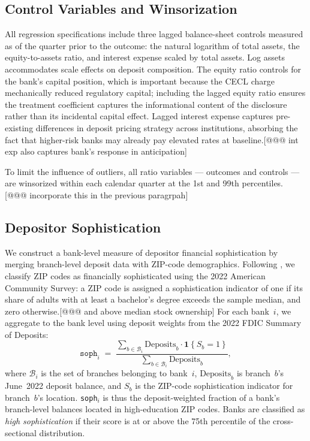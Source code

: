 \subsection{Control Variables and Winsorization}
\label{sec:data:controls}

All regression specifications include three lagged balance-sheet controls
measured as of the quarter prior to the outcome: the natural logarithm of total
assets, the equity-to-assets ratio, and interest expense scaled by total assets.
Log assets accommodates scale effects on deposit composition. The
equity ratio controls for the bank's capital position, which is important because
the CECL charge mechanically reduced regulatory capital; including the lagged
equity ratio ensures the treatment coefficient captures the informational content
of the disclosure rather than its incidental capital effect. Lagged interest
expense captures pre-existing differences in deposit pricing strategy across
institutions, absorbing the fact that higher-risk banks may already pay elevated
rates at baseline.[@@@ int exp also captures bank's response in anticipation]

To limit the influence of outliers, all ratio variables --- outcomes and
controls --- are winsorized within each calendar quarter at the 1st and 99th
percentiles. [@@@ incorporate this in the previous paragrpah]

\subsection{Depositor Sophistication}
\label{sec:data:sophistication}

We construct a bank-level measure of depositor financial sophistication by
merging branch-level deposit data with ZIP-code demographics. Following
\citet{narayanan2026decline}, we classify ZIP codes as financially sophisticated
using the 2022 American Community Survey: a ZIP code is assigned a sophistication
indicator of one if its share of adults with at least a bachelor's degree exceeds
the sample median, and zero otherwise.[@@@ and above median stock ownership]
For each bank~$i$, we aggregate to the bank level using deposit weights from
the 2022 FDIC Summary of Deposits:
\begin{equation}
  \texttt{soph}_{i}
  \;=\;
  \frac{
    \displaystyle\sum_{b \in \mathcal{B}_i}
      \mathrm{Deposits}_{b} \cdot \mathbf{1}\!\left\{S_{b} = 1\right\}
  }{
    \displaystyle\sum_{b \in \mathcal{B}_i} \mathrm{Deposits}_{b}
  },
  \label{eq:sophistication}
\end{equation}
where $\mathcal{B}_i$ is the set of branches belonging to bank~$i$,
$\mathrm{Deposits}_b$ is branch~$b$'s June~2022 deposit balance, and $S_b$ is
the ZIP-code sophistication indicator for branch~$b$'s location.
\texttt{soph}$_i$ is thus the deposit-weighted fraction of a bank's
branch-level balances located in high-education ZIP codes.  Banks are
classified as \emph{high sophistication} if their score is at or above the
75th percentile of the cross-sectional distribution. 

